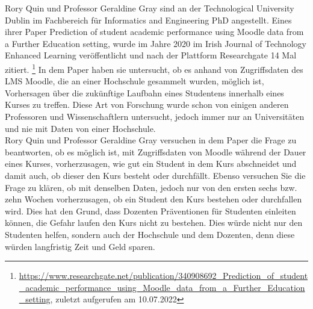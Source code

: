 Rory Quin und Professor Geraldine Gray sind an der \glqq Technological University Dublin\grqq{} im Fachbereich für \glqq Informatics and Engineering PhD \grqq{} angestellt.
Eines ihrer Paper \glqq Prediction of student academic performance using Moodle data from a Further Education setting\grqq{}, wurde im Jahre 2020 im Irish Journal of Technology Enhanced Learning  veröffentlicht und nach der Plattform Researchgate 14 Mal zitiert.  \footnote{\url{https://www.researchgate.net/publication/340908692_Prediction_of_student_academic_performance_using_Moodle_data_from_a_Further_Education_setting}, zuletzt aufgerufen am 10.07.2022}
In dem Paper haben sie untersucht, ob es anhand von Zugriffsdaten des \ac{LMS} Moodle, die an einer Hochschule gesammelt wurden, möglich ist, Vorhersagen über die zukünftige Laufbahn eines Studentens innerhalb eines Kurses zu treffen. Diese Art von Forschung wurde schon von einigen anderen Professoren und Wissenschaftlern untersucht, jedoch immer nur an Universitäten und nie mit Daten von einer Hochschule. \cite[S. 5]{Quinn.2020}
\\ \noindent
Rory Quin und Professor Geraldine Gray versuchen in dem Paper die Frage zu beantworten, ob es möglich ist, mit Zugriffsdaten von Moodle während der Dauer eines Kurses, vorherzusagen, wie gut ein Student in dem Kurs abschneidet und damit auch, ob dieser den Kurs besteht oder durchfällt.
Ebenso versuchen Sie die Frage zu klären, ob mit denselben Daten, jedoch nur von den ersten sechs bzw. zehn Wochen vorherzusagen, ob ein Student den Kurs bestehen oder durchfallen wird. \cite[S. 5]{Quinn.2020}
Dies hat den Grund, dass Dozenten Präventionen für Studenten einleiten können, die Gefahr laufen den Kurs nicht zu bestehen. Dies würde nicht nur den Studenten helfen, sondern auch der Hochschule und dem Dozenten, denn diese würden langfristig Zeit und Geld sparen. \cite[S. 15]{Quinn.2020}

